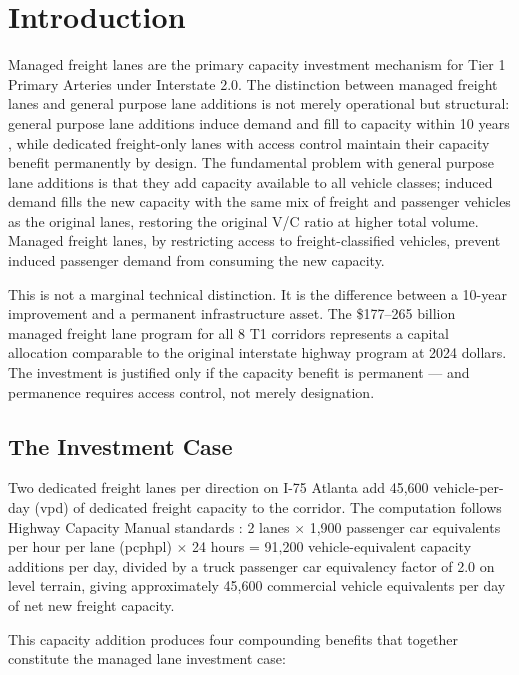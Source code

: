 \section{Introduction}

Managed freight lanes are the primary capacity investment mechanism for Tier 1 Primary Arteries under Interstate 2.0. The distinction between managed freight lanes and general purpose lane additions is not merely operational but structural: general purpose lane additions induce demand and fill to capacity within 10 years \citep{Duranton2011}, while dedicated freight-only lanes with access control maintain their capacity benefit permanently by design. The fundamental problem with general purpose lane additions is that they add capacity available to all vehicle classes; induced demand fills the new capacity with the same mix of freight and passenger vehicles as the original lanes, restoring the original V/C ratio at higher total volume. Managed freight lanes, by restricting access to freight-classified vehicles, prevent induced passenger demand from consuming the new capacity.

This is not a marginal technical distinction. It is the difference between a 10-year improvement and a permanent infrastructure asset. The \$177--265 billion managed freight lane program for all 8 T1 corridors represents a capital allocation comparable to the original interstate highway program at 2024 dollars. The investment is justified only if the capacity benefit is permanent --- and permanence requires access control, not merely designation.

\subsection*{The Investment Case}

Two dedicated freight lanes per direction on I-75 Atlanta add 45,600 vehicle-per-day (vpd) of dedicated freight capacity to the corridor. The computation follows Highway Capacity Manual standards \citep{HCM7}: 2 lanes $\times$ 1,900 passenger car equivalents per hour per lane (pcphpl) $\times$ 24 hours = 91,200 vehicle-equivalent capacity additions per day, divided by a truck passenger car equivalency factor of 2.0 on level terrain, giving approximately 45,600 commercial vehicle equivalents per day of net new freight capacity.

This capacity addition produces four compounding benefits that together constitute the managed lane investment case:

